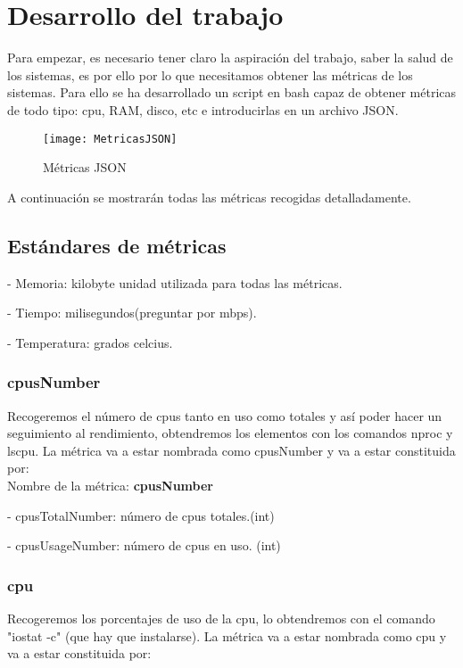 \documentclass[ spanish, a4paper, 12pt, oneside]{report}
\begin{document}
\chapter{Desarrollo del trabajo}
Para empezar, es necesario tener claro la aspiración del trabajo, saber la salud de los sistemas, es por ello por lo que necesitamos 
obtener las métricas de los sistemas. Para ello se ha desarrollado un script en bash capaz de obtener métricas de todo tipo: cpu, 
RAM, disco, etc e introducirlas en un archivo JSON.\\

\begin{figure}[!h]
   \centering
   \texttt{[image: MetricasJSON]}\\
      \caption{\label{fig: json} Métricas JSON}
\end{figure}

A continuación se mostrarán todas las métricas recogidas detalladamente.\\

\section{Estándares de métricas}

\hyp{} Memoria: kilobyte unidad utilizada para todas las métricas.

\hyp{} Tiempo: milisegundos(preguntar por mbps).

\hyp{} Temperatura: grados celcius.

\subsection{cpusNumber}
Recogeremos el número de cpus tanto en uso como totales y así poder hacer un seguimiento al rendimiento, obtendremos los elementos con 
los comandos nproc y lscpu. La métrica va a estar nombrada como cpusNumber y va a estar constituida por:\\

Nombre de la métrica: \textbf{cpusNumber}

\hyp{} cpusTotalNumber: número de cpus totales.(int)

\hyp{} cpusUsageNumber: número de cpus en uso. (int)

\subsection{cpu}
Recogeremos los porcentajes de uso de la cpu, lo obtendremos con el comando "iostat -c" (que hay que instalarse). 
La métrica va a estar nombrada como cpu y va a estar constituida por:\\
\end{document}
